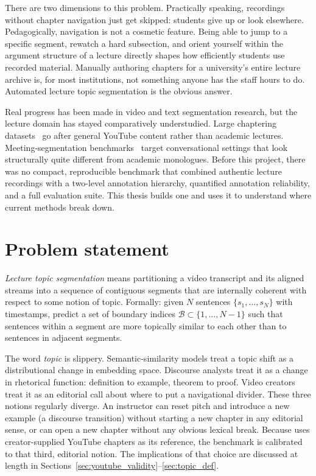 There are two dimensions to this problem. Practically speaking, recordings
without chapter navigation just get skipped: students give up or look
elsewhere. Pedagogically, navigation is not a cosmetic feature. Being able
to jump to a specific segment, rewatch a hard subsection, and orient yourself
within the argument structure of a lecture directly shapes how efficiently
students use recorded material. Manually authoring chapters for a university's
entire lecture archive is, for most institutions, not something anyone has the
staff hours to do. Automated lecture topic segmentation is the obvious answer.

Real progress has been made in video and text segmentation research, but the
lecture domain has stayed comparatively understudied. Large chaptering
datasets~\cite{yang2023_vidchapters,cao2022_chaptergen} go after general
YouTube content rather than academic lectures. Meeting-segmentation
benchmarks~\cite{janin2003icsi,mccowan2005ami} target conversational settings
that look structurally quite different from academic monologues. Before this
project, there was no compact, reproducible benchmark that combined authentic
lecture recordings with a two-level annotation hierarchy, quantified annotation
reliability, and a full evaluation suite. This thesis builds one and uses it
to understand where current methods break down.

\section{Problem statement}
\label{sec:problem}

\emph{Lecture topic segmentation} means partitioning a video transcript and
its aligned streams into a sequence of contiguous segments that are internally
coherent with respect to some notion of topic. Formally: given $N$ sentences
$\{s_1, \ldots, s_N\}$ with timestamps, predict a set of boundary indices
$\mathcal{B} \subset \{1, \ldots, N-1\}$ such that sentences within a segment
are more topically similar to each other than to sentences in adjacent segments.

The word \emph{topic} is slippery. Semantic-similarity models treat a topic
shift as a distributional change in embedding space. Discourse analysts treat
it as a change in rhetorical function: definition to example, theorem to proof.
Video creators treat it as an editorial call about where to put a navigational
divider. These three notions regularly diverge. An instructor can reset pitch
and introduce a new example (a discourse transition) without starting a new
chapter in any editorial sense, or can open a new chapter without any obvious
lexical break. Because \lecseg{} uses creator-supplied YouTube chapters as
its reference, the benchmark is calibrated to that third, editorial notion.
The implications of that choice are discussed at length in
Sections~\ref{sec:youtube_validity}--\ref{sec:topic_def}.

